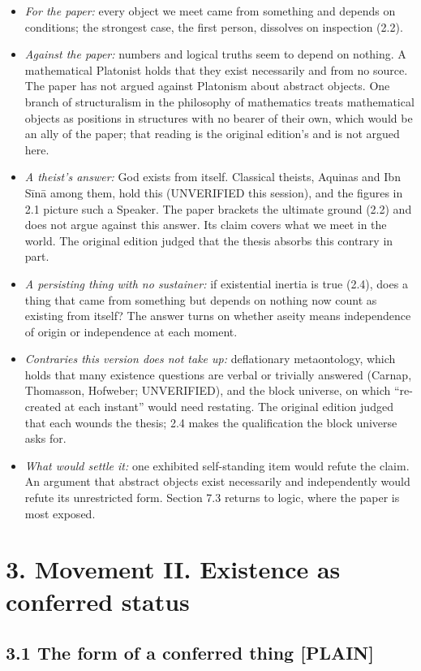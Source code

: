 \documentclass[11pt]{article}
\newcommand{\register}[1]{{\ttfamily\small #1}}
\begin{document}
\begin{itemize}
\item \emph{For the paper:} every object we meet came from something and depends on conditions; the strongest case, the first person, dissolves on inspection (2.2).
\item \emph{Against the paper:} numbers and logical truths seem to depend on nothing. A mathematical Platonist holds that they exist necessarily and from no source. The paper has not argued against Platonism about abstract objects. One branch of structuralism in the philosophy of mathematics treats mathematical objects as positions in structures with no bearer of their own, which would be an ally of the paper; that reading is the original edition's and is not argued here.
\item \emph{A theist's answer:} God exists from itself. Classical theists, Aquinas and Ibn Sīnā among them, hold this (UNVERIFIED this session), and the figures in 2.1 picture such a Speaker. The paper brackets the ultimate ground (2.2) and does not argue against this answer. Its claim covers what we meet in the world. The original edition judged that the thesis absorbs this contrary in part.
\item \emph{A persisting thing with no sustainer:} if existential inertia is true (2.4), does a thing that came from something but depends on nothing now count as existing from itself? The answer turns on whether aseity means independence of origin or independence at each moment.
\item \emph{Contraries this version does not take up:} deflationary metaontology, which holds that many existence questions are verbal or trivially answered (Carnap, Thomasson, Hofweber; UNVERIFIED), and the block universe, on which ``re-created at each instant'' would need restating. The original edition judged that each wounds the thesis; 2.4 makes the qualification the block universe asks for.
\item \emph{What would settle it:} one exhibited self-standing item would refute the claim. An argument that abstract objects exist necessarily and independently would refute its unrestricted form. Section 7.3 returns to logic, where the paper is most exposed.
\end{itemize}
\section*{3. Movement II. Existence as conferred status}

\subsection*{3.1 The form of a conferred thing \register{[PLAIN]}}
\end{document}
